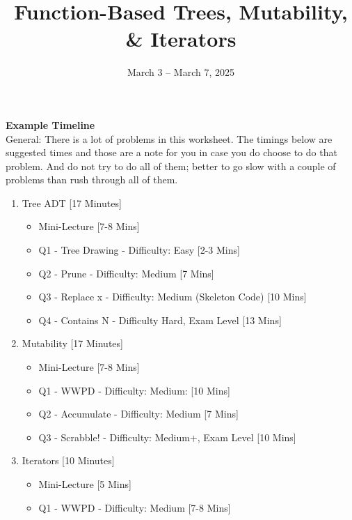 \documentclass{exam}
\title{Function-Based Trees, Mutability, \& Iterators}
\date{March 3 -- March 7, 2025}
\begin{document}
\maketitle

\begin{meta}
    \textbf{Example Timeline}\\
    General: There is a lot of problems in this worksheet. The timings below are suggested times and those are a note for you in case you do choose to do that problem. And do not try to do all of them; better to go slow with a couple of problems than rush through all of them.
    \begin{enumerate}
        \item Tree ADT [17 Minutes] {\begin{itemize} 
        \item Mini-Lecture [7-8 Mins]
        \item Q1 - Tree Drawing - Difficulty: Easy [2-3 Mins]
        \item Q2 - Prune - Difficulty: Medium [7 Mins]
        \item Q3 - Replace x - Difficulty: Medium (Skeleton Code) [10 Mins]
        \item Q4 - Contains N - Difficulty Hard, Exam Level [13 Mins]
        \end{itemize}}
        \item Mutability [17 Minutes] {\begin{itemize} 
            \item Mini-Lecture [7-8 Mins]
            \item Q1 - WWPD - Difficulty: Medium: [10 Mins]
            \item Q2 - Accumulate - Difficulty: Medium [7 Mins]
            \item Q3 - Scrabble! - Difficulty: Medium+, Exam Level [10 Mins]
        \end{itemize}}
        \item Iterators [10 Minutes] {\begin{itemize} 
            \item Mini-Lecture [5 Mins]
            \item Q1 - WWPD - Difficulty: Medium [7-8 Mins]
        \end{itemize}}
    \end{enumerate}
\end{meta}
\end{document}
